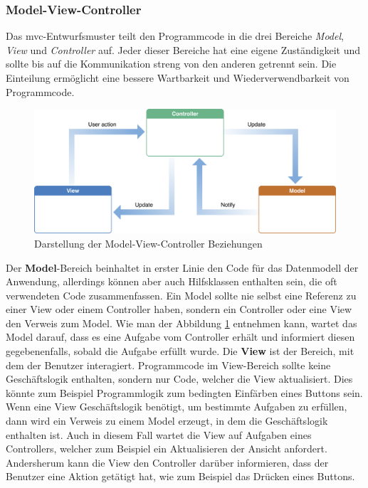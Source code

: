 \subsubsection{Model-View-Controller}
Das \ac{mvc}-Entwurfsmuster teilt den Programmcode in die drei Bereiche \textit{Model}, \textit{View} und \textit{Controller} auf.
Jeder dieser Bereiche hat eine eigene Zuständigkeit und sollte bis auf die Kommunikation streng von den anderen getrennt sein.
Die Einteilung ermöglicht eine bessere Wartbarkeit und Wiederverwendbarkeit von Programmcode.\\[10pt]
\begin{figure}[h!]
	\centering
	\includegraphics[scale=0.3]{images/model-view-controller}
	\caption{Darstellung der Model-View-Controller Beziehungen \parencite{APP2018}}
	\label{fig:model-view-controller}
\end{figure}
\pbreak%
Der \textbf{Model}-Bereich beinhaltet in erster Linie den Code für das Datenmodell der Anwendung, allerdings können aber auch Hilfsklassen enthalten sein, die oft verwendeten Code zusammenfassen.
Ein Model sollte nie selbst eine Referenz zu einer View oder einem Controller haben, sondern ein Controller oder eine View den Verweis zum Model.
Wie man der Abbildung \ref{fig:model-view-controller} entnehmen kann, wartet das Model darauf, dass es eine Aufgabe vom Controller erhält und informiert diesen gegebenenfalls, sobald die Aufgabe erfüllt wurde.\pbreak%
%
Die \textbf{View} ist der Bereich, mit dem der Benutzer interagiert.
Programmcode im View-Bereich sollte keine Geschäftslogik enthalten, sondern nur Code, welcher die View aktualisiert.
Dies könnte zum Beispiel Programmlogik zum bedingten Einfärben eines Buttons sein.
Wenn eine View Geschäftslogik benötigt, um bestimmte Aufgaben zu erfüllen, dann wird ein Verweis zu einem Model erzeugt, in dem die Geschäftslogik enthalten ist.
Auch in diesem Fall wartet die View auf Aufgaben eines Controllers, welcher zum Beispiel ein Aktualisieren der Ansicht anfordert.
Andersherum kann die View den Controller darüber informieren, dass der Benutzer eine Aktion getätigt hat, wie zum Beispiel das Drücken eines Buttons.\pbreak%
